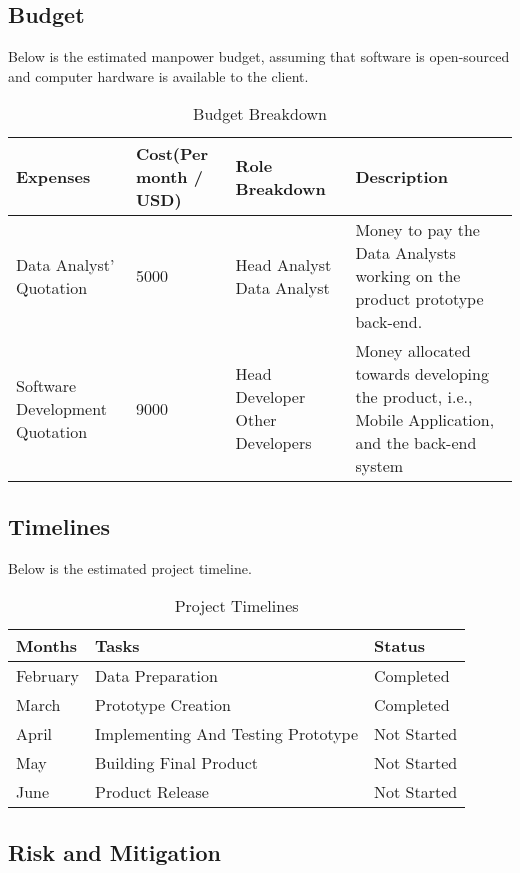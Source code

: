 \documentclass[12pt,a4paper]{article}
\begin{document}
\subsection{Budget}

Below is the estimated manpower budget, assuming that software is open-sourced and computer hardware is available to the client.

\begin{table}[h!]
\begin{tabular}{ | p{3.5cm} | p{2cm} | p{3.5cm} | p{6cm} |  }
 \hline
 Expenses & Cost(Per month / USD) & Role Breakdown & Description \\
 \hline
 Data Analyst' Quotation & 5000  & Head Analyst Data Analyst &
Money to pay the Data Analysts working on the product prototype back-end.\\
 
 Software Development Quotation & 9000 & Head Developer Other Developers & Money allocated towards developing the product, i.e., Mobile Application, and the back-end system\\
 \hline
 \end{tabular}
 \caption{Budget Breakdown}
\label{table:1}
\end{table}

\subsection{Timelines}

Below is the estimated project timeline.

\begin{table}[h!]
\begin{tabular}{ | p{4cm} | p{8cm} | p{4cm} |  }
 \hline
 Months & Tasks	& Status \\
 \hline
 February & Data Preparation & Completed \\
 March & Prototype Creation	& Completed \\
 April	& Implementing And Testing Prototype & Not Started \\
 May	& Building Final Product & Not Started \\
 June & Product Release & Not Started \\
 \hline
 \end{tabular}
 \caption{Project Timelines}
\label{table:2}
\end{table}

\subsection{Risk and Mitigation}
\end{document}
